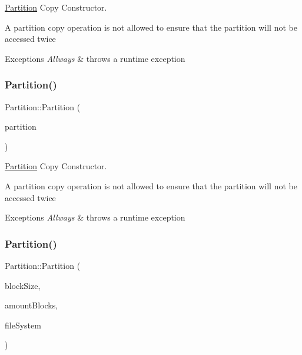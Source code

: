 \mbox{\hyperlink{classcore_1_1logic_1_1_partition}{Partition}} Copy Constructor. 

A partition copy operation is not allowed to ensure that the partition will not be accessed twice 
\begin{DoxyExceptions}{Exceptions}
{\em Allways} & throws a runtime exception \\
\hline
\end{DoxyExceptions}
\mbox{\label{classcore_1_1logic_1_1_partition_a019dc9e3d0c13954cd5d72f2049f21fd}} 
\subsubsection{\texorpdfstring{Partition()}{Partition()}\hspace{0.1cm}{\footnotesize\ttfamily [2/3]}}
{\footnotesize\ttfamily Partition\+::\+Partition (\begin{DoxyParamCaption}\item[{\mbox{\hyperlink{classcore_1_1logic_1_1_partition}{Partition}} \&}]{partition }\end{DoxyParamCaption})\hspace{0.3cm}{\ttfamily [private]}}



\mbox{\hyperlink{classcore_1_1logic_1_1_partition}{Partition}} Copy Constructor. 

A partition copy operation is not allowed to ensure that the partition will not be accessed twice 
\begin{DoxyExceptions}{Exceptions}
{\em Allways} & throws a runtime exception \\
\hline
\end{DoxyExceptions}
\mbox{\label{classcore_1_1logic_1_1_partition_ad4a50cfda17b7996c8b1480e8701cf3a}} 
\subsubsection{\texorpdfstring{Partition()}{Partition()}\hspace{0.1cm}{\footnotesize\ttfamily [3/3]}}
{\footnotesize\ttfamily Partition\+::\+Partition (\begin{DoxyParamCaption}\item[{unsigned long long}]{block\+Size,  }\item[{unsigned long long}]{amount\+Blocks,  }\item[{\mbox{\hyperlink{classcore_1_1_i_file_system}{I\+File\+System}} $\ast$}]{file\+System }\end{DoxyParamCaption})}



